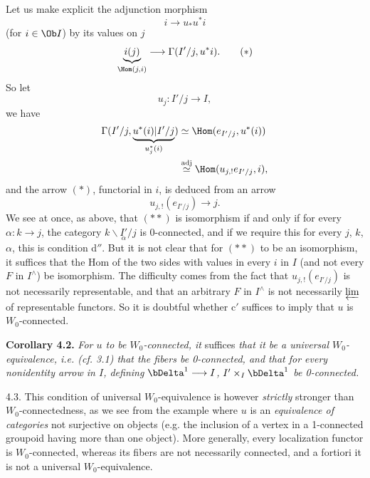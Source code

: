 Let us make explicit the adjunction morphism
\[
i \longrightarrow u_*u^*i
\]
(for $i \in \Ob I$) by its values on $j$
\[
\underbrace{i(j)}_{\Hom(j,i)} \longrightarrow \Gamma(I'/j, u^*i). \tag*{$(\ast)$}
\]
So let
\[
u_j : I'/j \longrightarrow I,
\]
we have
\[
\begin{aligned}
\Gamma(I'/j, \underbrace{u^*(i)|I'/j}_{u_j^*(i)}) &\simeq \Hom(e_{I'/j}, u^*(i)) \\ %
&\overset{\mathrm{adj}}{\simeq} \Hom(u_{j,!}e_{I'/j}, i),
\end{aligned}
\]
and the arrow $(\ast)$, functorial in $i$, is deduced from an arrow
\[
u_{j,!}(e_{I'/j}) \longrightarrow j. \tag*{$(\ast\ast)$}
\]
We see at once, as above, that $(\ast\ast)$ is isomorphism if and only if for every $\alpha : k \longrightarrow j$, the category $k\backslash\underset{\alpha}{I'}/j$ is 0-connected, and if we require this for every $j$, $k$, $\alpha$, this is condition d$''$. But it is not clear that for $(\ast\ast)$ to be an isomorphism, it suffices that the Hom of the two sides with values in every $i$ in $I$ (and not every $F$ in $I^{\wedge}$) be isomorphism. The difficulty comes from the fact that $u_{j,!}(e_{I'/j})$ is not necessarily representable, and that an arbitrary $F$ in $I^{\wedge}$ is not necessarily $\varprojlim$ of representable functors. So it is doubtful whether c$'$ suffices to imply that $u$ is $W_0$-connected.

\textbf{Corollary 4.2.} \textit{For $u$ to be $W_0$-connected, it} suffices \textit{that it be a universal $W_0$-equivalence, i.e. (cf. 3.1) that the fibers be \textup{0}-connected, and that for every nonidentity arrow in $I$, defining $\bDelta^1 \longrightarrow I$, $I' \times_I \bDelta^1$ be \textup{0}-connected.}

4.3. This condition of universal $W_0$-equivalence is however \textit{strictly} stronger than $W_0$-connectedness, as we see from the example where $u$ is an \textit{equivalence of categories} not surjective on objects (e.g. the inclusion of a vertex in a 1-connected groupoid having more than one object). More generally, every localization functor is $W_0$-connected, whereas its fibers are not necessarily connected, and a fortiori it is not a universal $W_0$-equivalence.

